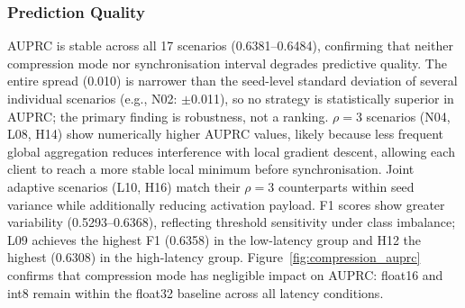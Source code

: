 \documentclass[conference]{IEEEtran}
\begin{document}
\subsubsection{Prediction Quality}
\label{subsubsec:sim_pred}

AUPRC is stable across all 17 scenarios (0.6381--0.6484), confirming that neither compression mode nor synchronisation interval degrades predictive quality. The entire spread (0.010) is narrower than the seed-level standard deviation of several individual scenarios (e.g., N02: $\pm$0.011), so no strategy is statistically superior in AUPRC; the primary finding is robustness, not a ranking. $\rho{=}3$ scenarios (N04, L08, H14) show numerically higher AUPRC values, likely because less frequent global aggregation reduces interference with local gradient descent, allowing each client to reach a more stable local minimum before synchronisation. Joint adaptive scenarios (L10, H16) match their $\rho{=}3$ counterparts within seed variance while additionally reducing activation payload. F1 scores show greater variability (0.5293--0.6368), reflecting threshold sensitivity under class imbalance; L09 achieves the highest F1 (0.6358) in the low-latency group and H12 the highest (0.6308) in the high-latency group. Figure~\ref{fig:compression_auprc} confirms that compression mode has negligible impact on AUPRC: float16 and int8 remain within the float32 baseline across all latency conditions.
\end{document}
